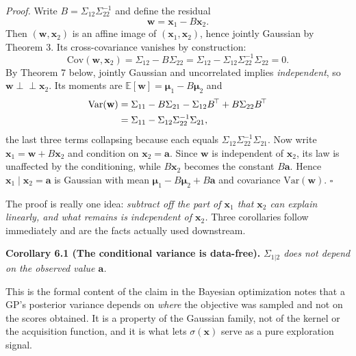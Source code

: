 \documentclass[conference]{IEEEtran}
\begin{document}
\medskip
\textit{Proof.} Write $B = \Sigma_{12}\Sigma_{22}^{-1}$ and define the residual
\begin{equation}
    \mathbf{w} = \mathbf{x}_1 - B\mathbf{x}_2 .
\end{equation}
Then $(\mathbf{w}, \mathbf{x}_2)$ is an affine image of $(\mathbf{x}_1,\mathbf{x}_2)$, hence jointly Gaussian by Theorem 3. Its cross-covariance vanishes by construction:
\begin{equation}
    \mathrm{Cov}(\mathbf{w}, \mathbf{x}_2) = \Sigma_{12} - B\Sigma_{22} = \Sigma_{12} - \Sigma_{12}\Sigma_{22}^{-1}\Sigma_{22} = 0 .
\end{equation}
By Theorem 7 below, jointly Gaussian and uncorrelated implies \textit{independent}, so $\mathbf{w} \perp\!\!\!\perp \mathbf{x}_2$. Its moments are $\mathbb{E}[\mathbf{w}] = \boldsymbol{\mu}_1 - B\boldsymbol{\mu}_2$ and
\begin{align}
    \mathrm{Var}(\mathbf{w}) &= \Sigma_{11} - B\Sigma_{21} - \Sigma_{12}B^{\!\top} + B\Sigma_{22}B^{\!\top} \notag \\
    &= \Sigma_{11} - \Sigma_{12}\Sigma_{22}^{-1}\Sigma_{21},
\end{align}
the last three terms collapsing because each equals $\Sigma_{12}\Sigma_{22}^{-1}\Sigma_{21}$. Now write $\mathbf{x}_1 = \mathbf{w} + B\mathbf{x}_2$ and condition on $\mathbf{x}_2 = \mathbf{a}$. Since $\mathbf{w}$ is independent of $\mathbf{x}_2$, its law is unaffected by the conditioning, while $B\mathbf{x}_2$ becomes the constant $B\mathbf{a}$. Hence $\mathbf{x}_1 \mid \mathbf{x}_2 = \mathbf{a}$ is Gaussian with mean $\boldsymbol{\mu}_1 - B\boldsymbol{\mu}_2 + B\mathbf{a}$ and covariance $\mathrm{Var}(\mathbf{w})$. $\square$

\medskip
The proof is really one idea: \textit{subtract off the part of $\mathbf{x}_1$ that $\mathbf{x}_2$ can explain linearly, and what remains is independent of $\mathbf{x}_2$.} Three corollaries follow immediately and are the facts actually used downstream.

\medskip
\noindent\textbf{Corollary 6.1 (The conditional variance is data-free).}
\textit{$\Sigma_{1|2}$ does not depend on the observed value $\mathbf{a}$.}

\medskip
This is the formal content of the claim in the Bayesian optimization notes that a GP's posterior variance depends on \textit{where} the objective was sampled and not on the scores obtained. It is a property of the Gaussian family, not of the kernel or the acquisition function, and it is what lets $\sigma(\mathbf{x})$ serve as a pure exploration signal.
\end{document}
